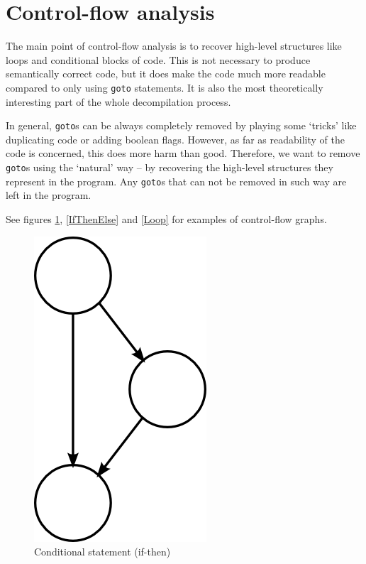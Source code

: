 \documentclass[12pt,twoside,notitlepage]{report}
\begin{document}
\section{Control-flow analysis}

The main point of control-flow analysis is to recover high-level
structures like loops and conditional blocks of code.
This is not necessary to produce semantically correct code,
but it does make the code much more readable compared to
only using \verb|goto| statements.  It is also
the most theoretically interesting part of the whole
decompilation process.

In general, \verb|goto|s can be always completely removed
by playing some `tricks' like duplicating code or adding
boolean flags.  However, as far as readability of the
code is concerned, this does more harm than good.
Therefore, we want to remove \verb|goto|s using the `natural'
way -- by recovering the high-level structures they represent
in the program.  Any \verb|goto|s that can not be removed
in such way are left in the program.

See figures \ref{IfThen}, \ref{IfThenElse} and \ref{Loop}
for examples of control-flow graphs.

\begin{figure}[tbh]
\centerline{\includegraphics{figs/IfThen.png}}
\caption{\label{IfThen}Conditional statement (if-then)}
\end{figure}
\end{document}
